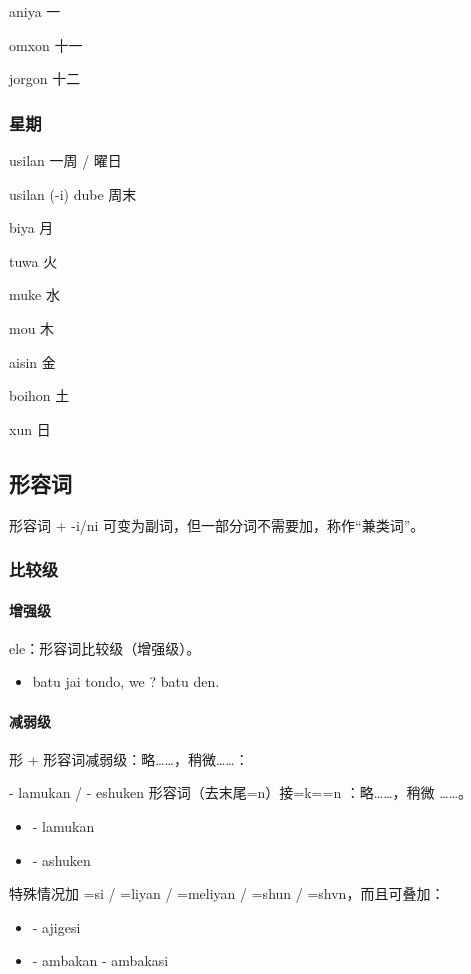 \begin{des}
    \item[aniya] 一
    \item[omxon] 十一
    \item[jorgon] 十二
\end{des}

\subsubsection{星期}

\begin{des}
    \item[usilan] 一周 / 曜日
    \item[usilan (-i) dube] 周末
    \item[biya] 月
    \item[tuwa] 火
    \item[muke] 水
    \item[mou] 木
    \item[aisin] 金
    \item[boihon] 土
    \item[xun]  日
\end{des}

\subsection{形容词}

形容词 + -i/ni 可变为副词，但一部分词不需要加，称作“兼类词”。

\subsubsection{比较级}

\paragraph{增强级}
ele：形容词比较级（增强级）。

\begin{itemize}
    \item batu jai tondo, we  ? batu  den.
\end{itemize}

\paragraph{减弱级}
形 +  形容词减弱级：略……，稍微……：

 - lamukan / 
 - eshuken
形容词（去末尾=n）接=k=\AIImedi=n ：略……，稍微 ……。
\begin{itemize}
    \item {} - lamukan
    \item {} - ashuken
\end{itemize}
\irg 特殊情况加 =si / =liyan / =meliyan / =shun / =shvn，而且可叠加：
\begin{itemize}
    \item {} - ajigesi
    \item {} - ambakan - ambakasi
\end{itemize}

